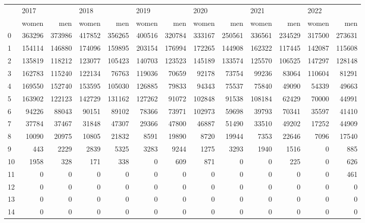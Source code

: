 \begin{tabular}{lrrrrrrrrrrrr}
\toprule
{} & \multicolumn{2}{l}{2017} & \multicolumn{2}{l}{2018} & \multicolumn{2}{l}{2019} & \multicolumn{2}{l}{2020} & \multicolumn{2}{l}{2021} & \multicolumn{2}{l}{2022} \\
{} &   women &     men &   women &     men &   women &     men &   women &     men &   women &     men &   women &     men \\
\midrule
0  &  363296 &  373986 &  417852 &  356265 &  400516 &  320784 &  333167 &  250561 &  336561 &  234529 &  317500 &  273631 \\
1  &  154114 &  146880 &  174096 &  159895 &  203154 &  176994 &  172265 &  144908 &  162322 &  117445 &  142087 &  115608 \\
2  &  135819 &  118212 &  123077 &  105423 &  140703 &  123523 &  145189 &  133574 &  125570 &  106525 &  147297 &  128148 \\
3  &  162783 &  115240 &  122134 &   76763 &  119036 &   70659 &   92178 &   73754 &   99236 &   83064 &  110604 &   81291 \\
4  &  169550 &  152740 &  153595 &  105030 &  126885 &   79833 &   94343 &   75537 &   75840 &   49090 &   54339 &   49663 \\
5  &  163902 &  122123 &  142729 &  131162 &  127262 &   91072 &  102848 &   91538 &  108184 &   62429 &   70000 &   44991 \\
6  &   94226 &   88043 &   90151 &   89102 &   78366 &   73971 &  102973 &   59698 &   39793 &   70341 &   35597 &   41410 \\
7  &   37784 &   37467 &   31848 &   47307 &   29366 &   47800 &   46887 &   51490 &   33510 &   49202 &   17252 &   44909 \\
8  &   10090 &   20975 &   10805 &   21832 &    8591 &   19890 &    8720 &   19944 &    7353 &   22646 &    7096 &   17540 \\
9  &     443 &    2229 &    2839 &    5325 &    3283 &    9244 &    1275 &    3293 &    1940 &    1516 &       0 &     885 \\
10 &    1958 &     328 &     171 &     338 &       0 &     609 &     871 &       0 &       0 &     225 &       0 &     626 \\
11 &       0 &       0 &       0 &       0 &       0 &       0 &       0 &       0 &       0 &       0 &       0 &     461 \\
12 &       0 &       0 &       0 &       0 &       0 &       0 &       0 &       0 &       0 &       0 &       0 &       0 \\
13 &       0 &       0 &       0 &       0 &       0 &       0 &       0 &       0 &       0 &       0 &       0 &       0 \\
14 &       0 &       0 &       0 &       0 &       0 &       0 &       0 &       0 &       0 &       0 &       0 &       0 \\
\bottomrule
\end{tabular}
